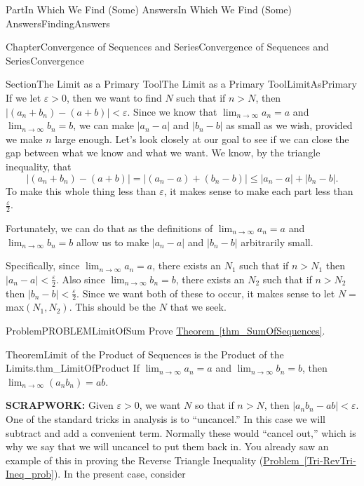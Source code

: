 \documentclass[oneside,10pt,]{book}
\newcommand{\xreffont}{\relax}
\newcommand{\terminology}[1]{\textbf{#1}}
\numberwithin{equation}{part}
\newcommand{\abs}[1]{\left|#1\right|}
\def\limit#1#2#3{{\displaystyle\lim_{#1\rightarrow #2}#3}}
\newcommand{\eps}{\varepsilon}
\newcommand{\lt}{<}
\begin{document}
\begin{partptx}{Part}{In Which We Find (Some) Answers}{}{In Which We Find (Some) Answers}{}{}{FindingAnswers}
\begin{chapterptx}{Chapter}{Convergence of Sequences and Series}{}{Convergence of Sequences and Series}{}{}{Convergence}
\begin{sectionptx}{Section}{The Limit as a Primary Tool}{}{The Limit as a Primary Tool}{}{}{LimitAsPrimary}
If we let \(\eps>0\), then we want to find \(N\) such that if \(n>N\), then \(\abs{\left(a_n+b_n\right)-\left(a+b\right)}\lt \eps\). Since we know that \(\limit{n}{\infty}{a_n}=a\) and \(\limit{n}{\infty}{b_n}=b\), we can make \(\abs{a_n-a}\) and \(\abs{b_n-b}\) as small as we wish, provided we make \(n\) large enough.  Let's look closely at our goal to see if we can close the gap between what we know and what we want.  We know, by the triangle inequality, that%
\begin{equation*}
\abs{\left(a_n+b_n\right)-\left(a+b\right)}=\abs{\left(a_n-a\right)+\left(b_n-b\right)}\leq\abs{a_n-a}+\abs{b_n-b}\text{.}
\end{equation*}
To make this whole thing less than \(\eps\), it makes sense to make each part less than \(\frac{\eps}{2}\).%
\par
Fortunately, we can do that as the definitions of \(\limit{n}{\infty}{a_n}=a\) and \(\limit{n}{\infty}{b_n}=b\) allow us to make \(\abs{a_n-a}\) and \(\abs{b_n-b}\) arbitrarily small.%
\par
Specifically, since \(\limit{n}{\infty}{a_n}=a\), there exists an \(N_1\) such that if \(n>N_1\) then \(\abs{a_n-a}\lt \frac{\eps}{2}\).  Also since \(\limit{n}{\infty}{b_n}=b\), there exists an \(N_2\) such that if \(n>N_2\) then \(\abs{b_n-b}\lt
\frac{\eps}{2}\).  Since we want both of these to occur, it makes sense to let \(N=\)max\(\left(N_1,N_2\right)\).  This should be the \(N\) that we seek.%
\begin{problem}{Problem}{}{PROBLEMLimitOfSum}%
Prove \hyperref[thm_SumOfSequences]{Theorem~{\xreffont\ref{thm_SumOfSequences}}}.%
\end{problem}
\begin{theorem}{Theorem}{Limit of the Product of Sequences is the Product of the Limits.}{}{thm_LimitOfProduct}%
%
%
If \(\limit{n}{\infty}{a_n}=a\) and \(\limit{n}{\infty}{b_n}=b\), then \(\limit{n}{\infty}{\left(a_n b_n\right)}=a b\).%
\end{theorem}
\terminology{SCRAPWORK:} Given \(\eps>0\), we want \(N\) so that if \(n>N\), then \(\abs{a_n  b_n-a  b}\lt \eps\). One of the standard tricks in analysis is to ``uncancel.'' In this case we will subtract and add a convenient term. Normally these would ``cancel out,'' which is why we say that we will uncancel to put them back in. You already saw an example of this in proving the Reverse Triangle Inequality (\hyperref[Tri-RevTri-Ineq_prob]{Problem~{\xreffont\ref{Tri-RevTri-Ineq_prob}}}). In the present case, consider%

\end{sectionptx}
\end{chapterptx}
\end{partptx}
\end{document}
